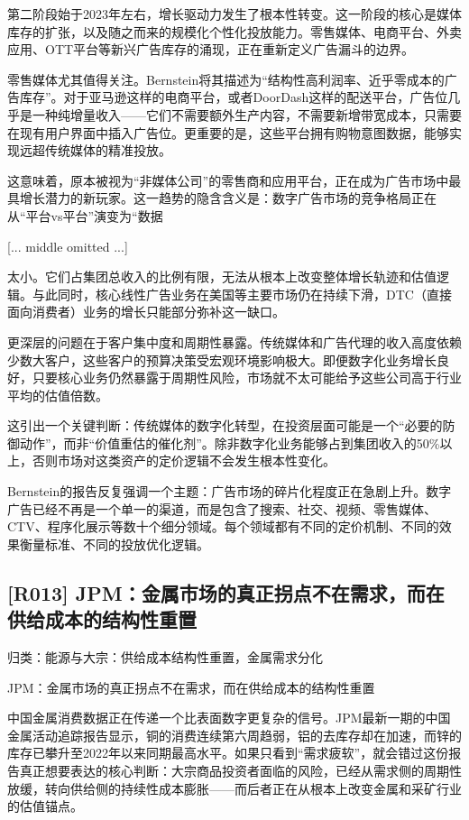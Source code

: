 \documentclass[11pt]{ctexart}
\begin{document}
第二阶段始于2023年左右，增长驱动力发生了根本性转变。这一阶段的核心是媒体库存的扩张，以及随之而来的规模化个性化投放能力。零售媒体、电商平台、外卖应用、OTT平台等新兴广告库存的涌现，正在重新定义广告漏斗的边界。

零售媒体尤其值得关注。Bernstein将其描述为“结构性高利润率、近乎零成本的广告库存”。对于亚马逊这样的电商平台，或者DoorDash这样的配送平台，广告位几乎是一种纯增量收入——它们不需要额外生产内容，不需要新增带宽成本，只需要在现有用户界面中插入广告位。更重要的是，这些平台拥有购物意图数据，能够实现远超传统媒体的精准投放。

这意味着，原本被视为“非媒体公司”的零售商和应用平台，正在成为广告市场中最具增长潜力的新玩家。这一趋势的隐含含义是：数字广告市场的竞争格局正在从“平台vs平台”演变为“数据

[... middle omitted ...]

太小。它们占集团总收入的比例有限，无法从根本上改变整体增长轨迹和估值逻辑。与此同时，核心线性广告业务在美国等主要市场仍在持续下滑，DTC（直接面向消费者）业务的增长只能部分弥补这一缺口。

更深层的问题在于客户集中度和周期性暴露。传统媒体和广告代理的收入高度依赖少数大客户，这些客户的预算决策受宏观环境影响极大。即便数字化业务增长良好，只要核心业务仍然暴露于周期性风险，市场就不太可能给予这些公司高于行业平均的估值倍数。

这引出一个关键判断：传统媒体的数字化转型，在投资层面可能是一个“必要的防御动作”，而非“价值重估的催化剂”。除非数字化业务能够占到集团收入的50\%以上，否则市场对这类资产的定价逻辑不会发生根本性变化。

Bernstein的报告反复强调一个主题：广告市场的碎片化程度正在急剧上升。数字广告已经不再是一个单一的渠道，而是包含了搜索、社交、视频、零售媒体、CTV、程序化展示等数十个细分领域。每个领域都有不同的定价机制、不同的效果衡量标准、不同的投放优化逻辑。

\subsection{[R013] JPM：金属市场的真正拐点不在需求，而在供给成本的结构性重置}
{\small\color{refgray}归类：能源与大宗：供给成本结构性重置，金属需求分化}

JPM：金属市场的真正拐点不在需求，而在供给成本的结构性重置

中国金属消费数据正在传递一个比表面数字更复杂的信号。JPM最新一期的中国金属活动追踪报告显示，铜的消费连续第六周趋弱，铝的去库存却在加速，而锌的库存已攀升至2022年以来同期最高水平。如果只看到“需求疲软”，就会错过这份报告真正想要表达的核心判断：大宗商品投资者面临的风险，已经从需求侧的周期性放缓，转向供给侧的持续性成本膨胀——而后者正在从根本上改变金属和采矿行业的估值锚点。
\end{document}
